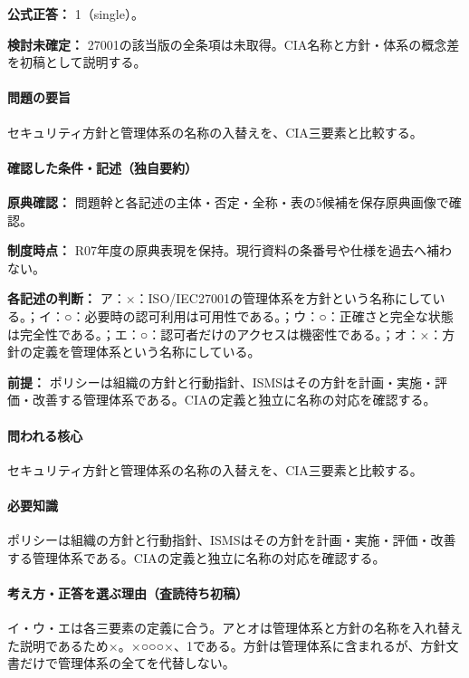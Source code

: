 \textbf{公式正答：} 1（single）。

\par\textbf{検討未確定：} 27001の該当版の全条項は未取得。CIA名称と方針・体系の概念差を初稿として説明する。

\paragraph{問題の要旨} セキュリティ方針と管理体系の名称の入替えを、CIA三要素と比較する。

\paragraph{確認した条件・記述（独自要約）}\mbox{}\par

\noindent\textbf{原典確認：} 問題幹と各記述の主体・否定・全称・表の5候補を保存原典画像で確認。\par

\noindent\textbf{制度時点：} R07年度の原典表現を保持。現行資料の条番号や仕様を過去へ補わない。\par

\noindent\textbf{各記述の判断：} ア：×：ISO/IEC27001の管理体系を方針という名称にしている。；イ：○：必要時の認可利用は可用性である。；ウ：○：正確さと完全な状態は完全性である。；エ：○：認可者だけのアクセスは機密性である。；オ：×：方針の定義を管理体系という名称にしている。\par

\noindent\textbf{前提：} ポリシーは組織の方針と行動指針、ISMSはその方針を計画・実施・評価・改善する管理体系である。CIAの定義と独立に名称の対応を確認する。\par

\paragraph{問われる核心} セキュリティ方針と管理体系の名称の入替えを、CIA三要素と比較する。

\paragraph{必要知識} ポリシーは組織の方針と行動指針、ISMSはその方針を計画・実施・評価・改善する管理体系である。CIAの定義と独立に名称の対応を確認する。

\paragraph{考え方・正答を選ぶ理由（査読待ち初稿）} イ・ウ・エは各三要素の定義に合う。アとオは管理体系と方針の名称を入れ替えた説明であるため×。×○○○×、1である。方針は管理体系に含まれるが、方針文書だけで管理体系の全てを代替しない。

